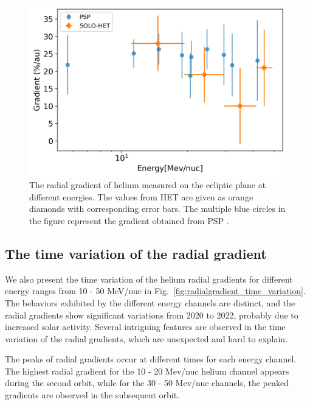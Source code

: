 \begin{figure}[!htb]
    \centering
    \includegraphics{images/ACR/Energydependent_normal_mask20230612.png}
    \caption[Energy dependency of the helium radial gradient]{The radial gradient of helium measured on the ecliptic plane at different energies. The values from \ac{HET} are given as orange diamonds with corresponding error bars. The multiple blue circles in the figure represent the gradient obtained from \ac{PSP} \citep{Rankin2021ApJ}.}
    \label{fig:comparison_SOLO_PSP}
\end{figure}



\subsection*{The time variation of the radial gradient}

We also present the time variation of the helium radial gradients for different energy ranges from 10 - 50 MeV/nuc in Fig.~\ref{fig:radialgradient_time_variation}. The behaviors exhibited by the different energy channels are distinct, and the radial gradients show significant variations from 2020 to 2022, probably due to increased solar activity. Several intriguing features are observed in the time variation of the radial gradients, which are unexpected and hard to explain.

The peaks of radial gradients occur at different times for each energy channel. The highest radial gradient for the 10 - 20 Mev/nuc helium channel appears during the second orbit, while for the 30 - 50 Mev/nuc channels, the peaked gradients are observed in the subsequent orbit.

